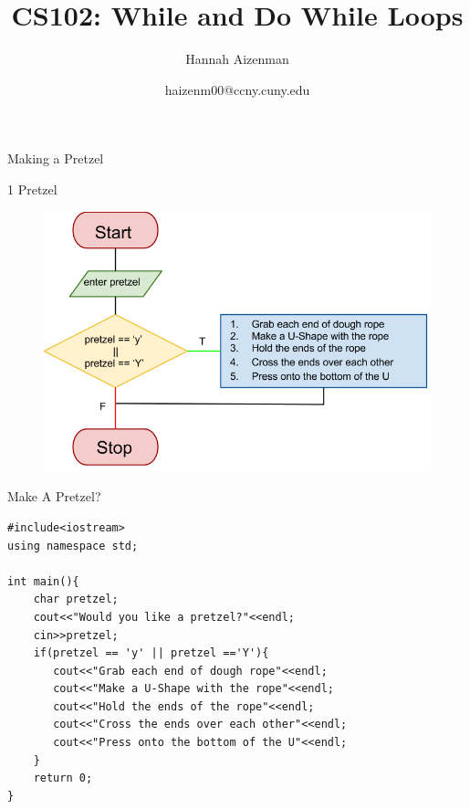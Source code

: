 \documentclass[xcolor={dvipsnames}]{beamer}
\begin{document}
\title{ CS102: While and Do While Loops }
\author{Hannah Aizenman}
\date{haizenm00@ccny.cuny.edu}


\begin{frame}
	\titlepage
\end{frame}

\begin{frame}{Making a Pretzel}
	\begin{center}
	\end{center}
\end{frame}

\begin{frame}{1 Pretzel}
	\begin{figure}
		\includegraphics[width=.8\textwidth]{if_pretzel}
	\end{figure}
\end{frame}

%
\begin{frame}[fragile]{Make A Pretzel?}
\begin{verbatim}
#include<iostream>
using namespace std;

int main(){
    char pretzel;
    cout<<"Would you like a pretzel?"<<endl;
    cin>>pretzel;
    if(pretzel == 'y' || pretzel =='Y'){
       cout<<"Grab each end of dough rope"<<endl;
       cout<<"Make a U-Shape with the rope"<<endl;
       cout<<"Hold the ends of the rope"<<endl;
       cout<<"Cross the ends over each other"<<endl;
       cout<<"Press onto the bottom of the U"<<endl;
    }
    return 0;
}
\end{verbatim}
\end{frame}
\end{document}
